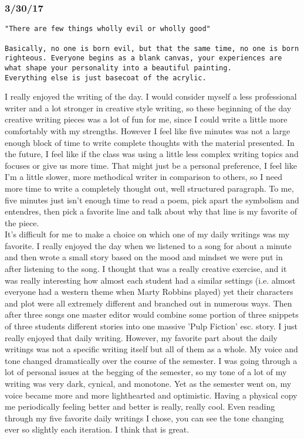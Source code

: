 \documentclass[12pt,letterpaper]{article}
\begin{document}
\subsubsection*{3/30/17}
\begin{verbatim}
"There are few things wholly evil or wholly good"

Basically, no one is born evil, but that the same time, no one is born
righteous. Everyone begins as a blank canvas, your experiences are 
what shape your personality into a beautiful painting.
Everything else is just basecoat of the acrylic. 
\end{verbatim}
I really enjoyed the writing of the day. I would consider myself a less professional writer and a lot stronger in creative style writing, so these beginning of the day creative writing pieces was a lot of fun for me, since I could write a little more comfortably with my strengths. However I feel like five minutes was not a large enough block of time to write complete thoughts with the material presented. In the future, I feel like if the class was using a little less complex writing topics and focuses or give us more time. That might just be a personal preference, I feel like I'm a little slower, more methodical writer in comparison to others, so I need more time to write a completely thought out, well structured paragraph. To me, five minutes just isn't enough time to read a poem, pick apart the symbolism and entendres, then pick a favorite line and talk about why that line is my favorite of the piece.\\
It's difficult for me to make a choice on which one of my daily writings was my favorite. I really enjoyed the day when we listened to a song for about a minute and then wrote a small story based on the mood and mindset we were put in after listening to the song. I thought that was a really creative exercise, and it was really interesting how almost each student had a similar settings (i.e. almost everyone had a western theme when Marty Robbins played) yet their characters and plot were all extremely different and branched out in numerous ways. Then after three songs one master editor would combine some portion of three snippets of three students different stories into one massive 'Pulp Fiction' esc. story. I just really enjoyed that daily writing. However, my favorite part about the daily writings was not a specific writing itself but all of them as a whole. My voice and tone changed dramatically over the course of the semester. I was going through a lot of personal issues at the begging of the semester, so my tone of a lot of my writing was very dark, cynical, and monotone. Yet as the semester went on, my voice became more and more lighthearted and optimistic. Having a physical copy me periodically feeling better and better is really, really cool. Even reading through my five favorite daily writings I chose, you can see the tone changing ever so slightly each iteration. I think that is great. 
\end{document}
